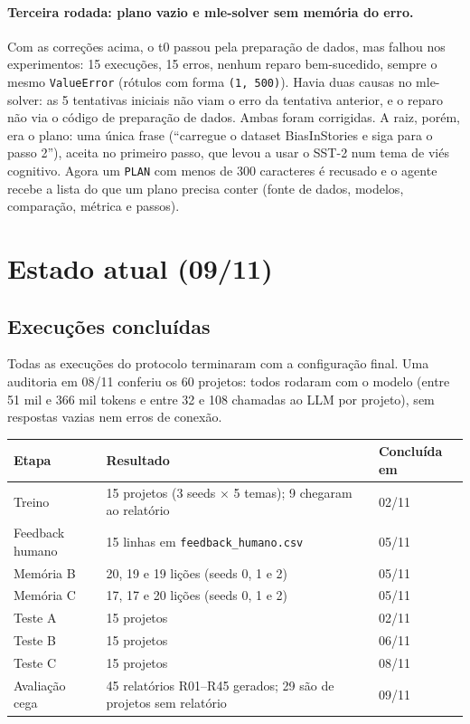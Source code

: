 \documentclass[11pt,a4paper]{article}
\begin{document}
\paragraph{Terceira rodada: plano vazio e mle-solver sem memória do erro.} Com as correções acima,
o t0 passou pela preparação de dados, mas falhou nos experimentos: 15 execuções, 15 erros, nenhum reparo
bem-sucedido, sempre o mesmo \texttt{ValueError} (rótulos com forma \texttt{(1, 500)}). Havia duas causas no
mle-solver: as 5 tentativas iniciais não viam o erro da tentativa anterior, e o reparo não via o código de
preparação de dados. Ambas foram corrigidas. A raiz, porém, era o plano: uma única frase (``carregue o
dataset BiasInStories e siga para o passo 2''), aceita no primeiro passo, que levou a usar o SST-2 num tema
de viés cognitivo. Agora um \texttt{PLAN} com menos de 300 caracteres é recusado e o agente recebe a lista
do que um plano precisa conter (fonte de dados, modelos, comparação, métrica e passos).

\section{Estado atual (09/11)}
\label{sec:estado}

\subsection{Execuções concluídas}

Todas as execuções do protocolo terminaram com a configuração final. Uma auditoria em 08/11
conferiu os 60 projetos: todos rodaram com o modelo (entre 51 mil e 366 mil tokens e entre 32 e
108 chamadas ao LLM por projeto), sem respostas vazias nem erros de conexão.

\begin{center}
\small
\begin{tabular}{lll}
\toprule
Etapa & Resultado & Concluída em \\
\midrule
Treino & 15 projetos (3 seeds $\times$ 5 temas); 9 chegaram ao relatório & 02/11 \\
Feedback humano & 15 linhas em \texttt{feedback\_humano.csv} & 05/11 \\
Memória B & 20, 19 e 19 lições (seeds 0, 1 e 2) & 05/11 \\
Memória C & 17, 17 e 20 lições (seeds 0, 1 e 2) & 05/11 \\
Teste A & 15 projetos & 02/11 \\
Teste B & 15 projetos & 06/11 \\
Teste C & 15 projetos & 08/11 \\
Avaliação cega & 45 relatórios R01--R45 gerados; 29 são de projetos sem relatório & 09/11 \\
\bottomrule
\end{tabular}
\end{center}
\end{document}
